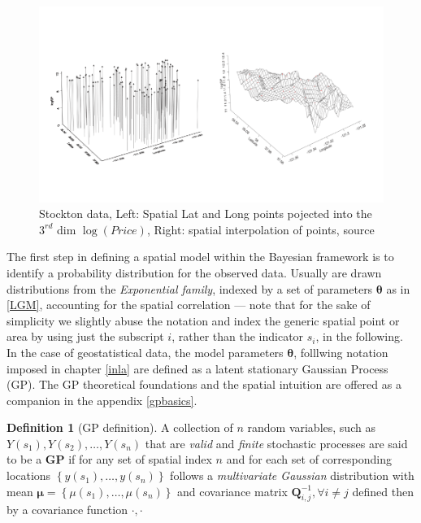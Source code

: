 \documentclass[
  12pt,
  a4paper,
  oneside]{book}
\theoremstyle{definition}
\newtheorem{definition}{Definition}[chapter]
\theoremstyle{definition}
\theoremstyle{definition}
\theoremstyle{remark}
\begin{document}
\begin{figure}
\centering
\includegraphics{images/prdprocess.png}
\caption{\label{fig:prdproc}Stockton data, Left: Spatial Lat and Long points pojected into the \(3^{rd}\) dim \(\log(Price)\), Right: spatial interpolation of points, source \citet{Blangiardo-Cameletti}}
\end{figure}

The first step in defining a spatial model within the Bayesian framework is to identify a probability distribution for the observed data. Usually are drawn distributions from the \emph{Exponential family}, indexed by a set of parameters \(\boldsymbol\theta\) as in \ref{LGM}, accounting for the spatial correlation --- note that for the sake of simplicity we slightly abuse the notation and index the generic spatial point or area by using just the subscript \(i\), rather than the indicator \(s_i\), in the following.
In the case of geostatistical data, the model parameters \(\boldsymbol\theta\), folllwing notation imposed in chapter \ref{inla} are defined as a latent stationary Gaussian Process (GP). The GP theoretical foundations and the spatial intuition are offered as a companion in the appendix \ref{gpbasics}.

\begin{definition}[GP definition]
\protect\hypertarget{def:GP}{}{\label{def:GP} {} }A collection of \(n\) random variables, such as \(Y(s_{1}), Y(s_{2}) , \ldots, Y(s_{n})\) that are \emph{valid} and \emph{finite} stochastic processes are said to be a \textbf{GP} if for any set of spatial index \(n\) and for each set of corresponding locations \(\left\{y\left(s_{1}\right), \ldots, y\left(s_{n}\right)\right\}\) follows a \emph{multivariate Gaussian} distribution with mean \(\boldsymbol{\mu}=\left\{\mu\left(s_{1}\right), \ldots, \mu\left(s_{n}\right)\right\}\) and covariance matrix \(\mathbf{Q}^{-1}_{i,j}, \forall i \neq j\) defined then by a covariance function \(\mathscr{\cdot, \cdot}\)
\end{definition}
\end{document}
